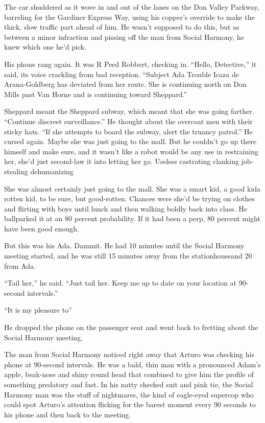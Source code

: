 The car shuddered as it wove in and out of the lanes on the Don
Valley Parkway, barreling for the Gardiner Express Way, using his
copper’s override to make the thick, slow traffic part ahead of
him. He wasn’t supposed to do this, but as between a minor
infraction and pissing off the man from Social Harmony, he knew
which one he’d pick.

His phone rang again. It was R Peed Robbert, checking in. “Hello,
Detective,” it said, its voice crackling from bad reception.
“Subject Ada Trouble Icaza de Arana-Goldberg has deviated from her
route. She is continuing north on Don Mills past Van Horne and is
continuing toward Sheppard.”

Sheppard meant the Sheppard subway, which meant that she was going
farther. “Continue discreet surveillance.” He thought about the
overcoat men with their sticky hats. “If she attempts to board the
subway, alert the truancy patrol.” He cursed again. Maybe she was
just going to the mall. But he couldn’t go up there himself and
make sure, and it wasn’t like a robot would be any use in
restraining her, she’d just second-law it into letting her go.
Useless castrating clanking job-stealing dehumanizing{\dash}

She was almost certainly just going to the mall. She was a smart
kid, a good kid{\dash}a rotten kid, to be sure, but good-rotten. Chances
were she’d be trying on clothes and flirting with boys until lunch
and then walking boldly back into class. He ballparked it at an 80
percent probability. If it had been a perp, 80 percent might have
been good enough.

But this was his Ada. Dammit. He had 10 minutes until the Social
Harmony meeting started, and he was still 15 minutes away from the
stationhouse{\dash}and 20 from Ada.

“Tail her,” he said. “Just tail her. Keep me up to date on your
location at 90-second intervals.”

“It is my pleasure to{\dash}”

He dropped the phone on the passenger seat and went back to
fretting about the Social Harmony meeting.

\tb

The man from Social Harmony noticed right away that Arturo was
checking his phone at 90-second intervals. He was a bald, thin man
with a pronounced Adam’s apple, beak-nose and shiny round head that
combined to give him the profile of something predatory and fast.
In his natty checked suit and pink tie, the Social Harmony man was
the stuff of nightmares, the kind of eagle-eyed supercop who could
spot Arturo’s attention flicking for the barest moment every 90
seconds to his phone and then back to the meeting.

